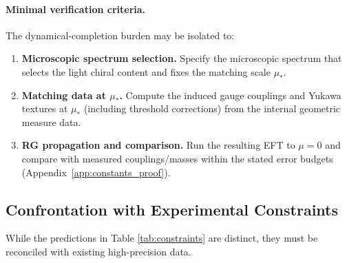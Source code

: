 \paragraph{Minimal verification criteria.}
The dynamical-completion burden may be isolated to:
\begin{enumerate}
    \item \textbf{Microscopic spectrum selection.} Specify the microscopic spectrum that selects the light chiral content and fixes the matching scale $\mu_\ast$.
    \item \textbf{Matching data at $\mu_\ast$.} Compute the induced gauge couplings and Yukawa textures at $\mu_\ast$ (including threshold corrections) from the internal geometric measure data.
    \item \textbf{RG propagation and comparison.} Run the resulting EFT to $\mu=0$ and compare with measured couplings/masses within the stated error budgets (Appendix~\ref{app:constants_proof}).
\end{enumerate}

\subsection{Confrontation with Experimental Constraints}
While the predictions in Table \ref{tab:constraints} are distinct, they must be reconciled with existing high-precision data.

